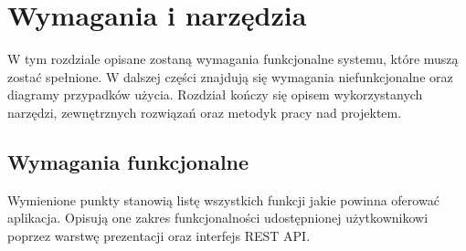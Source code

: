 \documentclass[a4paper,twoside,12pt]{book}
\begin{document}
\chapter{Wymagania i narzędzia}
\label{chap:Wymagania}
W tym rozdziale opisane zostaną wymagania funkcjonalne systemu, które muszą zostać spełnione. W dalszej części znajdują się wymagania niefunkcjonalne oraz diagramy przypadków użycia. Rozdział kończy się opisem wykorzystanych narzędzi, zewnętrznych rozwiązań oraz metodyk pracy nad projektem.

	\section{Wymagania funkcjonalne} 
	\label{sec:req}
	Wymienione punkty stanowią listę wszystkich funkcji jakie powinna oferować aplikacja. Opisują one zakres funkcjonalności udostępnionej użytkownikowi poprzez warstwę prezentacji oraz interfejs REST API.
\end{document}
